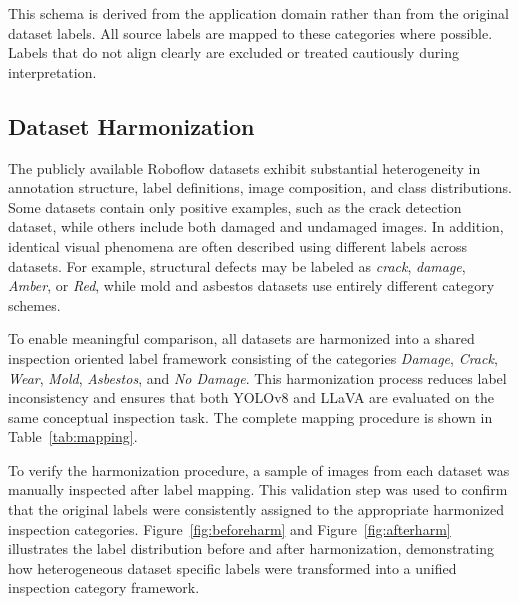 This schema is derived from the application domain rather than from the original dataset labels. All source labels are mapped to these categories where possible. Labels that do not align clearly are excluded or treated cautiously during interpretation.


\subsection{Dataset Harmonization}
\label{subsec:dataset_harmonization}

The publicly available Roboflow datasets exhibit substantial heterogeneity in annotation structure, label definitions, image composition, and class distributions. Some datasets contain only positive examples, such as the crack detection dataset, while others include both damaged and undamaged images. In addition, identical visual phenomena are often described using different labels across datasets. For example, structural defects may be labeled as \textit{crack}, \textit{damage}, \textit{Amber}, or \textit{Red}, while mold and asbestos datasets use entirely different category schemes.

To enable meaningful comparison, all datasets are harmonized into a shared inspection oriented label framework consisting of the categories \textit{Damage}, \textit{Crack}, \textit{Wear}, \textit{Mold}, \textit{Asbestos}, and \textit{No Damage}. This harmonization process reduces label inconsistency and ensures that both YOLOv8 and LLaVA are evaluated on the same conceptual inspection task. The complete mapping procedure is shown in Table~\ref{tab:mapping}.

To verify the harmonization procedure, a sample of images from each dataset was manually inspected after label mapping. This validation step was used to confirm that the original labels were consistently assigned to the appropriate harmonized inspection categories. Figure~\ref{fig:beforeharm} and Figure~\ref{fig:afterharm} illustrates the label distribution before and after harmonization, demonstrating how heterogeneous dataset specific labels were transformed into a unified inspection category framework.

